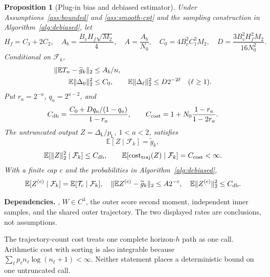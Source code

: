 \documentclass[11pt]{article}
\newtheorem{proposition}[theorem]{Proposition}
\newcommand{\E}{\mathbb E}
\newcommand{\1}{\mathbf 1}
\DeclarePairedDelimiter{\norm}{\lVert}{\rVert}
\newcommand{\cF}{\mathcal F}
\newcommand{\db}{\mathrm{db}}
\theoremstyle{definition}
\newcommand{\dependson}[1]{\par\noindent\textbf{Dependencies.} #1\par\smallskip}
\begin{document}
\begin{proposition}[Plug-in bias and debiased estimator]\label{prop:debias}
Under Assumptions~\ref{ass:bounded} and \ref{ass:smooth-cpt} and the sampling construction in Algorithm~\ref{alg:debiased}, let
\[
 H_f=C_3+2C_2,\quad A_b=\frac{B_vH_f\sqrt{M_2}}4,\quad
 A=\frac{A_b}{N_0},\quad C_0=4B_v^2C_1^2M_2,\quad
 D=\frac{3B_v^2H_f^2M_2}{16N_0^2}.
\]
Conditional on $\cF_k$,
\begin{align}
 \norm{\E T_n-\widetilde g_k}_2&\le A_b/n,\label{eq:plugin-bias}\\
 \E\norm{\Delta_0}_2^2&\le C_0,\qquad
 \E\norm{\Delta_\ell}_2^2\le D2^{-2\ell}\quad(\ell\ge1).
 \label{eq:level-second-moment}
\end{align}
Put $r_a=2^{-a}$, $q_a=2^{a-2}$, and
\begin{equation}\label{eq:uniform-db-constant}
 C_{\db}=\frac{C_0+Dq_a/(1-q_a)}{1-r_a},\qquad
 C_{\rm cost}=1+N_0\frac{1-r_a}{1-2r_a}.
\end{equation}
The untruncated output $Z=\Delta_{\mathsf L}/p_{\mathsf L}$, $1<a<2$, satisfies
\begin{equation}\label{eq:db-unbiased}
 \E[Z\mid\cF_k]=\widetilde g_k,
\end{equation}
\begin{equation}\label{eq:db-second-moment}
 \E[\norm{Z}_2^2\mid\cF_k]\le C_{\db},\qquad
 \E[\operatorname{cost}_{\rm traj}(Z)\mid\cF_k]=C_{\rm cost}<\infty.
\end{equation}
With a finite cap $c$ and the probabilities in Algorithm~\ref{alg:debiased},
\begin{equation}\label{eq:cap-bias}
 \E[Z^{(c)}\mid\cF_k]=\E[\mathcal T_c\mid\cF_k],\quad
 \norm{\E Z^{(c)}-\widetilde g_k}_2\le A2^{-c},\quad
 \E\norm{Z^{(c)}}_2^2\le C_{\db}.
\end{equation}
\end{proposition}
\dependson{, $W\in C^3$, the outer score second moment, independent inner samples, and the shared outer trajectory. The two displayed rates are conclusions, not assumptions.}
The trajectory-count cost treats one complete horizon-$h$ path as one call. Arithmetic cost with sorting is also integrable because $\sum_\ell p_\ell n_\ell\log(n_\ell+1)<\infty$. Neither statement places a deterministic bound on one untruncated call.
\end{document}
